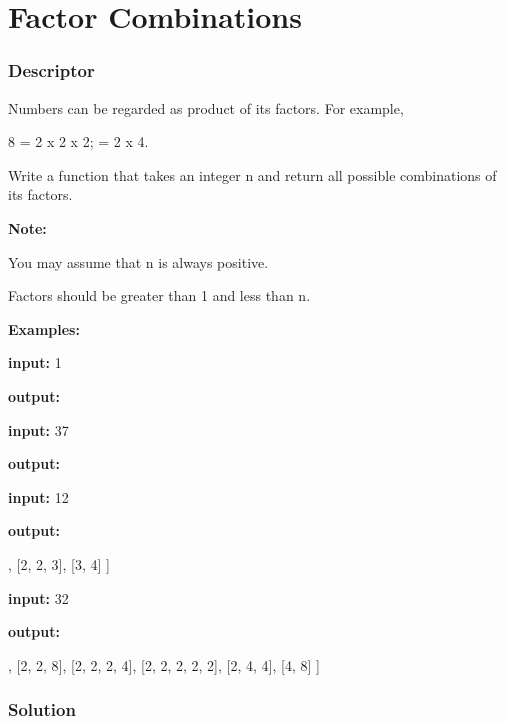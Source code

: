 \newpage

\section{Factor Combinations} %
\subsubsection{Descriptor}
Numbers can be regarded as product of its factors. For example,
\begin{Code}
8 = 2 x 2 x 2;
  = 2 x 4.
\end{Code}
Write a function that takes an integer n and return all possible combinations of its factors.

\textbf{Note:}

You may assume that n is always positive.

Factors should be greater than 1 and less than n.

\textbf{Examples:}

\textbf{input:} 1

\textbf{output:} \code{[]}

\textbf{input:} 37

\textbf{output:} \code{[]}

\textbf{input:} 12

\textbf{output:}

\begin{Code}
[
  [2, 6],
  [2, 2, 3],
  [3, 4]
]
\end{Code}

\textbf{input:} 32

\textbf{output:}

\begin{Code}
[
  [2, 16],
  [2, 2, 8],
  [2, 2, 2, 4],
  [2, 2, 2, 2, 2],
  [2, 4, 4],
  [4, 8]
]
\end{Code}

\newpage

\subsubsection{Solution}

